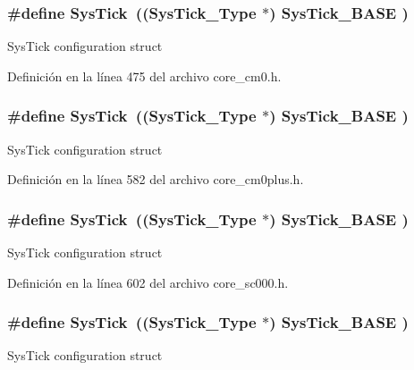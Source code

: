\subsubsection[{\texorpdfstring{Sys\+Tick}{SysTick}}]{\setlength{\rightskip}{0pt plus 5cm}\#define Sys\+Tick~(({\bf Sys\+Tick\+\_\+\+Type}   $\ast$)     {\bf Sys\+Tick\+\_\+\+B\+A\+SE}  )}\hypertarget{group___c_m_s_i_s__core__base_gacd96c53beeaff8f603fcda425eb295de}{}\label{group___c_m_s_i_s__core__base_gacd96c53beeaff8f603fcda425eb295de}
Sys\+Tick configuration struct 

Definición en la línea 475 del archivo core\+\_\+cm0.\+h.

\subsubsection[{\texorpdfstring{Sys\+Tick}{SysTick}}]{\setlength{\rightskip}{0pt plus 5cm}\#define Sys\+Tick~(({\bf Sys\+Tick\+\_\+\+Type}   $\ast$)     {\bf Sys\+Tick\+\_\+\+B\+A\+SE}  )}\hypertarget{group___c_m_s_i_s__core__base_gacd96c53beeaff8f603fcda425eb295de}{}\label{group___c_m_s_i_s__core__base_gacd96c53beeaff8f603fcda425eb295de}
Sys\+Tick configuration struct 

Definición en la línea 582 del archivo core\+\_\+cm0plus.\+h.

\subsubsection[{\texorpdfstring{Sys\+Tick}{SysTick}}]{\setlength{\rightskip}{0pt plus 5cm}\#define Sys\+Tick~(({\bf Sys\+Tick\+\_\+\+Type}   $\ast$)     {\bf Sys\+Tick\+\_\+\+B\+A\+SE}  )}\hypertarget{group___c_m_s_i_s__core__base_gacd96c53beeaff8f603fcda425eb295de}{}\label{group___c_m_s_i_s__core__base_gacd96c53beeaff8f603fcda425eb295de}
Sys\+Tick configuration struct 

Definición en la línea 602 del archivo core\+\_\+sc000.\+h.

\subsubsection[{\texorpdfstring{Sys\+Tick}{SysTick}}]{\setlength{\rightskip}{0pt plus 5cm}\#define Sys\+Tick~(({\bf Sys\+Tick\+\_\+\+Type}   $\ast$)     {\bf Sys\+Tick\+\_\+\+B\+A\+SE}  )}\hypertarget{group___c_m_s_i_s__core__base_gacd96c53beeaff8f603fcda425eb295de}{}\label{group___c_m_s_i_s__core__base_gacd96c53beeaff8f603fcda425eb295de}
Sys\+Tick configuration struct 

